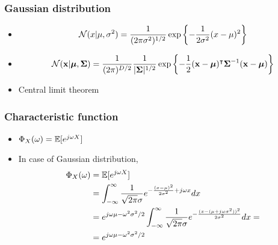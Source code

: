 \documentclass[10pt,mathserif]{beamer}
\begin{document}
\begin{frame}
\frametitle{Gaussian distribution}
\begin{itemize}\itemsep=12pt
\item
\begin{align}
\mathcal{N}(x | \mu, \sigma^2) = \frac{1}{(2\pi \sigma^2)^{1/2}}\exp\left\{-\frac{1}{2\sigma^2} (x-\mu)^2 \right\}\nonumber
\end{align}
\item 
\begin{align}
\mathcal{N}(\mathbf{x} | \boldsymbol{\mu}, \boldsymbol{\Sigma}) = \frac{1}{(2\pi)^{D/2}} \frac{1}{|\boldsymbol{\Sigma}|^{1/2}}\exp\left\{-\frac{1}{2} (\mathbf{x}-\boldsymbol{\mu})^\intercal \boldsymbol{\Sigma}^{-1}(\mathbf{x}-\boldsymbol{\mu})\right\}\nonumber
\end{align}
\item Central limit theorem 
\end{itemize}
\end{frame}
\begin{frame}
\frametitle{Characteristic function}
\begin{itemize}\itemsep=12pt
\item $\Phi_X(\omega) = \mathbb{E}[e^{j\omega X}]$
\item In case of Gaussian distribution,
\begin{align}
\Phi_X(\omega) &= \mathbb{E}[e^{j\omega X}]\nonumber\\
&=\int_{-\infty}^{\infty} \frac{1}{\sqrt{2\pi}\sigma}e^{-\frac{(x-\mu)^2}{2\sigma^2}+j\omega x} dx \nonumber\\
&=e^{j\omega \mu-\omega^2\sigma^2/2}\int_{-\infty}^{\infty} \frac{1}{\sqrt{2\pi}\sigma}e^{-\frac{(x-(\mu+j\omega \sigma^2))^2}{2\sigma^2}} dx =\nonumber\\
&=e^{j\omega \mu-\omega^2\sigma^2/2} \nonumber
\end{align}
\end{itemize}
\end{frame}
      
\end{document}
